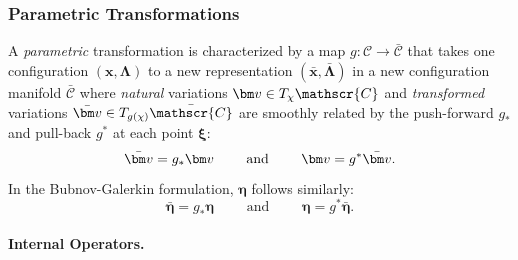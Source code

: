 \hypertarget{sec:parametric}{%
\subsubsection{Parametric Transformations}\label{sec:parametric}}

A \emph{parametric} transformation is characterized by a map
\(g: \mathscr{C}\rightarrow\bar{\mathscr{C}}\) that takes one
configuration \((\bm{x}, \bm{\Lambda})\) to a new representation
\((\bar{\bm{x}}, \bar{\bm{\Lambda}})\) in a new configuration manifold
\(\bar{\mathscr{C}}\) where \emph{natural} variations
\(\VarConfig\in T_\chi\mathscr{C}\) and \emph{transformed} variations
\(\bar{\VarConfig} \in T_{g(\chi)}\bar{\mathscr{C}}\) are smoothly related
by the push-forward \(g_*\) and pull-back \(g^*\) at each point \(\bm{\xi}\): 
%
\begin{equation}
  \bar{\VarConfig} = g_*\VarConfig
  \qquad\text{ and }\qquad
  \VarConfig = g^* \bar{\VarConfig}.
\label{eq:uubar-parametric}
\end{equation}
In the Bubnov-Galerkin formulation, \(\bm{\eta}\) follows similarly:
\begin{equation}
\bar{\bm{\eta}} = g_*\bm{\eta}
\qquad\text{ and }\qquad
\bm{\eta} = g^* \bar{\bm{\eta}}.
\label{eq:eta-parametric}
\end{equation}
%


\paragraph{Internal Operators.}\label{internal-operators}

